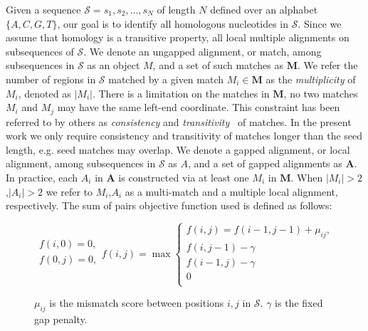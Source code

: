 \documentclass[twoside,11pt]{article}
\begin{document}
Given a sequence $\mathcal{S}=s_1, s_2,\dots, s_N$ of length $N$
defined over an alphabet $\{A,C,G,T\}$, our goal is to identify all homologous nucleotides in $\mathcal{S}$.
Since we assume that homology is a transitive property, all
local multiple alignments on subsequences of $\mathcal{S}$. We denote
an ungapped alignment, or match, among subsequences in $\mathcal{S}$
as an object $M$, and a set of such matches as $\mathbf{M}$.
We refer the number of regions in $\mathcal{S}$
matched by a given match $M_i \in \mathbf{M}$ as the
\textit{multiplicity} of $M_i$, denoted as $|M_i|$. There is a limitation on the matches in
$\mathbf{M}$, no two matches $M_i$ and $M_j$ may have the same
left-end coordinate.  This constraint has been referred to by others as \textit{consistency} and
\textit{transitivity}~\cite{ref-transitivity} of matches.  In the
present work we only require consistency and transitivity of matches
longer than the seed length, e.g. seed matches may overlap. We denote a gapped alignment, or local alignment, among subsequences in $\mathcal{S}$ as $A$, and a set of gapped alignments as $\mathbf{A}$.  In practice, each $A_i$ in $\mathbf{A}$ is constructed via
at least one $M_i$ in $\mathbf{M}$. When $|M_i|>2$,$|A_i|>2$ we refer to $M_i$,$A_i$ as
a multi-match and a multiple local alignment, respectively. The sum of pairs objective function used is defined as follows:\\
\begin{figure}[h!]
$$
\begin{array}{l}
f(i,0) = 0,\\
f(0,j) = 0,\\
\end{array}
f(i,j)= \max\left\{\begin{array}{l}
f(i,j) = f(i-1,j-1)+\mu_{ij},\\
f(i,j-1) - \gamma\\
f(i-1,j)-\gamma\\
0 \\
\end{array}\right.
$$
\begin{center}
$\mu_{ij}$ is the mismatch score between positions $i,j$ in $\mathcal{S}$.  $\gamma$ is the fixed gap penalty.

\end{center}

\label{ref-sop}
\end{figure}
\end{document}
